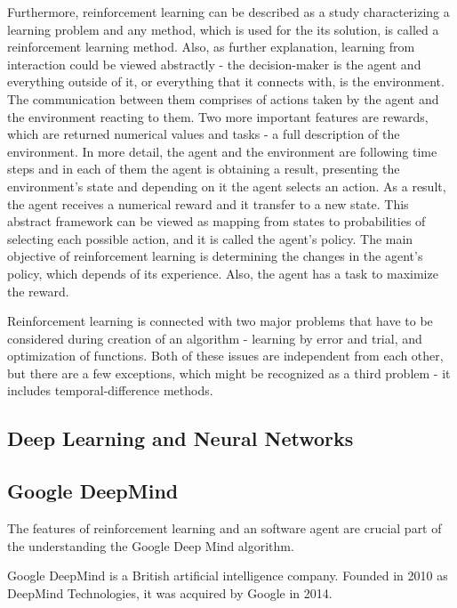 \documentclass{article}
\begin{document}
Furthermore, reinforcement learning can be described as a study characterizing a learning problem and any method, which is used for the its solution, is called a reinforcement learning method\cite{sutton1998reinforcement}. Also, as further explanation, learning from interaction could be viewed abstractly - the decision-maker is the agent and everything outside of it, or everything that it connects with, is the environment. The communication between them comprises of actions taken by the agent and the environment reacting to them. Two more important features are rewards, which are returned numerical values and tasks - a full description of the environment. In more detail, the agent and the environment are following time steps and in each of them the agent is obtaining a result, presenting the environment's state and depending on it the agent selects an action. As a result, the agent receives a numerical reward and it transfer to a new state. This abstract framework can be viewed as mapping from states to probabilities of selecting each possible action, and it is called the agent's policy\cite{sutton1998reinforcement}. The main objective of reinforcement learning is determining the changes in the agent's policy, which depends of its experience. Also, the agent has a task to maximize the reward. 

Reinforcement learning is connected with two major problems that have to be considered during creation of an algorithm - learning by error and trial, and optimization of functions. Both of these issues are independent from each other, but there are a few exceptions, which might be recognized as a third problem - it includes temporal-difference methods. \cite[Ch.\ 1, p. 16]{sutton1998reinforcement} 

\subsection{{\textbf{Deep Learning and Neural Networks}}}


\subsection{Google DeepMind}
The features of reinforcement learning and an software agent are crucial part of the understanding the Google Deep Mind algorithm.



Google DeepMind is a British artificial intelligence company. Founded in 2010 as DeepMind Technologies, it was acquired by Google in 2014. 
\end{document}
